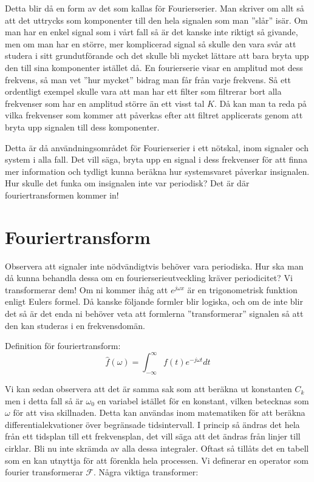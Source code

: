 \documentclass{article}
\begin{document}
Detta blir då en form av det som kallas för Fourierserier. Man skriver om allt så att det uttrycks som komponenter till den hela signalen som man ''slår'' isär. Om man har en enkel signal som i vårt fall så är det kanske inte riktigt så givande, men om man har en större, mer komplicerad signal så skulle den vara svår att studera i sitt grundutförande och det skulle bli mycket lättare att bara bryta upp den till sina komponenter istället då. \newline
En fourierserie visar en amplitud mot dess frekvens, så man vet ''hur mycket'' bidrag man får från varje frekvens. Så ett ordentligt exempel skulle vara att man har ett filter som filtrerar bort alla frekvenser som har en amplitud större än ett visst tal $K$. Då kan man ta reda på vilka frekvenser som kommer att påverkas efter att filtret applicerats genom att bryta upp signalen till dess komponenter. \newline

Detta är då användningsområdet för Fourierserier i ett nötskal, inom signaler och system i alla fall. Det vill säga, bryta upp en signal i dess frekvenser för att finna mer information och tydligt kunna beräkna hur systemsvaret påverkar insignalen. Hur skulle det funka om insignalen inte var periodisk? \newline
Det är där fouriertransformen kommer in!

\section{Fouriertransform}

Observera att signaler inte nödvändigtvis behöver vara periodiska. Hur ska man då kunna behandla dessa om en fourierserieutveckling kräver periodicitet? Vi transformerar dem! Om ni kommer ihåg att $e^{j\omega x}$ är en trigonometrisk funktion enligt Eulers formel. Då kanske följande formler blir logiska, och om de inte blir det så är det enda ni behöver veta att formlerna ''transformerar'' signalen så att den kan studeras i en frekvensdomän.

Definition för fouriertransform:
$$\hat{f}(\omega) = \int_{-\infty}^{\infty} f(t) e^{-j \omega t} dt$$

Vi kan sedan observera att det är samma sak som att beräkna ut konstanten $C_k$ men i detta fall så är $\omega_0$ en variabel istället för en konstant, vilken betecknas som $\omega$ för att visa skillnaden. 
Detta kan användas inom matematiken för att beräkna differentialekvationer över begränsade tidsintervall. I princip så ändras det hela från ett tidsplan till ett frekvensplan, det vill säga att det ändras från linjer till cirklar. %
Bli nu inte skrämda av alla dessa integraler. Oftast så tillåts det en tabell som en kan utnyttja för att förenkla hela processen. Vi definerar en operator som fourier transformerar $\mathcal{F}$. Några viktiga transformer:
\end{document}
